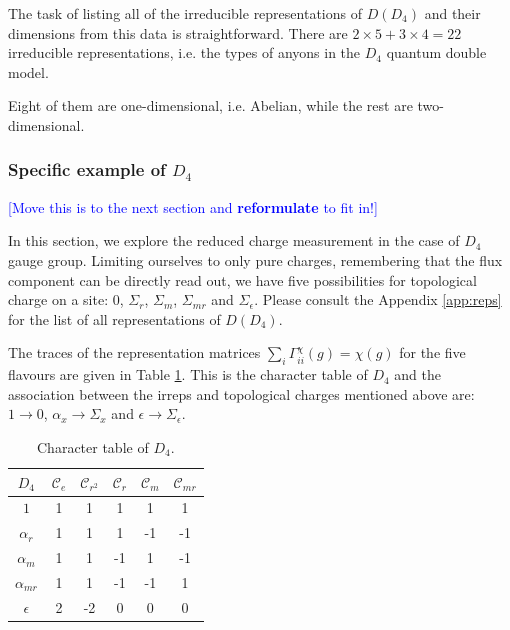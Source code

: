 \documentclass[two column]{article}
\newcommand{\jovan}[1]{\textcolor{blue}{[#1]}}
\begin{document}
The task of listing all of the irreducible representations of $D(D_4)$ and their dimensions from this data is straightforward. There are $2 \times 5  + 3 \times 4 = 22$ irreducible representations, i.e. the types of anyons in the $D_4$ quantum double model.

Eight of them are one-dimensional, i.e. Abelian, while the rest are two-dimensional. 


\subsubsection{Specific example of $D_4$}

\jovan{Move this is to the next section and \textbf{reformulate} to fit in!}

In this section, we explore the reduced charge measurement in the case of $D_4$ gauge group.
Limiting ourselves to only pure charges, remembering that the flux component can be directly read out, we have five possibilities for topological charge on a site: $0$, $\Sigma_r$, $\Sigma_m$, $\Sigma_{mr}$ and $\Sigma_{\epsilon}$. Please consult the Appendix \ref{app:reps} for the list of all representations of $D(D_4)$.

The traces of the representation matrices $\sum_i\Gamma^\chi_{ii}(g) = \chi(g)$ for the five flavours are given in Table \ref{tab:char}. This is the character table of $D_4$ and the association between the irreps and topological charges mentioned above are: $1 \rightarrow 0$, $\alpha_x \rightarrow \Sigma_x$ and $\epsilon \rightarrow \Sigma_\epsilon$.

\begin{table}[h]
\centering    \begin{tabular}{c|c c c c c }
         $D_4$ & $\mathcal C_e$ & $\mathcal C_{r^2}$ & $\mathcal C_{r}$ & $\mathcal C_m$ & $\mathcal C_{mr}$ \\
         \hline
         $1$ & 1 & 1 & 1 & 1 & 1 \\
         $\alpha_r $& 1 & 1 & 1 & -1 & -1  \\
         $\alpha_{m}$ & 1 & 1 & -1 & 1 & -1  \\
         $\alpha_{mr}$ & 1 & 1 & -1 & -1 & 1  \\
         $\epsilon$ & 2 & -2 & 0 & 0 & 0  \\
    \end{tabular}
    \caption{Character table of $D_4$.}\label{tab:char}
\end{table}
\end{document}
